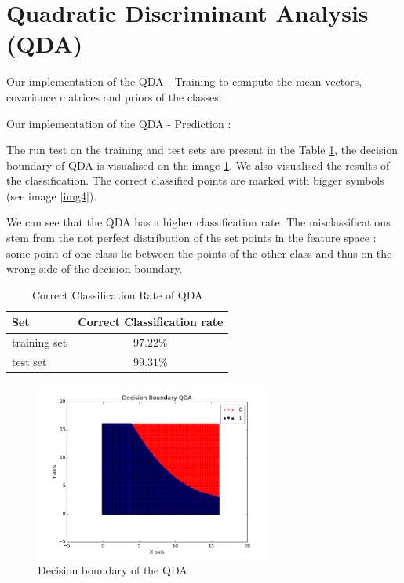 \documentclass{article}
\begin{document}
\section{Quadratic Discriminant Analysis (QDA)}

Our implementation of the QDA - Training to compute the mean vectors, covariance matrices and priors of the classes.



Our implementation of the QDA - Prediction :



The run test on the training and test sets are present in the Table \ref{Table1}, the decision boundary of QDA is visualised on the image \ref{img3}. We also visualised the results of the classification. The correct classified points are marked with bigger symbols (see image \ref{img4}).

We can see that the QDA has a higher classification rate. The misclassifications stem from the not perfect distribution of the set points in the feature space : some point of one class lie between the points of the other class and thus on the wrong side of the decision boundary.

\begin{table}[htb]
	\centering
	\begin{tabular}{|l | c|}
		\hline
		Set & Correct Classification rate \\ \hline
		training set & $97.22\%$  \\ 
		test set &  $99.31\%$ \\ \hline 
	\end{tabular}
\caption{Correct Classification Rate of QDA}
\label{Table1}
\end{table}

\begin{figure}[ht]
	\centering
  	\includegraphics[width=0.7\textwidth]{../DecisionBoundaryQDA.png}
  	\caption{Decision boundary of the QDA}
	\label{img3}
\end{figure}
\end{document}

